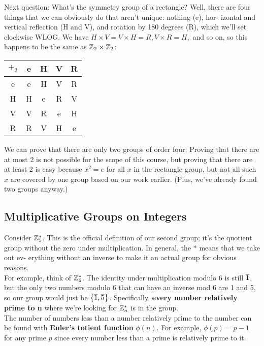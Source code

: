 Next question: What's the symmetry group of a rectangle? Well, there are
four things that we can obviously do that aren't unique: nothing (e), hor-
izontal and vertical reﬂection (H and V), and rotation by 180 degrees (R),
which we'll set clockwise WLOG.
We have $H \times V = V \times H = R, V \times R = H,$ and so on, so this happens to be
the same as $\mathbb{Z}_2 \times \mathbb{Z}_2$:
\begin{center}
    \begin{tabular}{|c|c|c|c|c|}
        \hline 
        $+_2$ & e & H & V & R \\ \hline 
        e & e & H & V & R \\ \hline 
        H & H & e & R & V \\ \hline 
        V & V & R & e & H \\ \hline 
        R & R & V & H & e \\ \hline 
    \end{tabular}
\end{center}
We can prove that there are only two groups of order four. Proving that
there are at most 2 is not possible for the scope of this course, but proving
that there are at least 2 is easy because $x^2 = e$ for all $x$ in the rectangle group,
but not all such $x$ are covered by one group based on our work earlier. (Plus,
we've already found two groups anyway.)

\subsection{Multiplicative Groups on Integers}
Consider $\mathbb{Z}_5^*$. This is the official deﬁnition of our second group; it's the quotient 
group without the zero under multiplication. In general, the $*$ means that we take out ev-
erything without an inverse to make it an actual group for obvious reasons.\\

For example, think of $\mathbb{Z}^*_6$. The identity under multiplication modulo 6 is
still $\overline{1}$, but the only two numbers modulo 6 that can have an inverse mod 6
are 1 and 5, so our group would just be $\left\{\overline{1}, \overline{5}\right\}$. Speciﬁcally, \textbf{every number
relatively prime to n} where we're looking for $\mathbb{Z}_n^*$ is in the group. \\

The number of numbers less than a number relatively prime to the number
can be found with \textbf{Euler's totient function} $\phi(n)$. For example, $\phi(p) = p - 1$
for any prime $p$ since every number less than a prime is relatively prime to
it.

